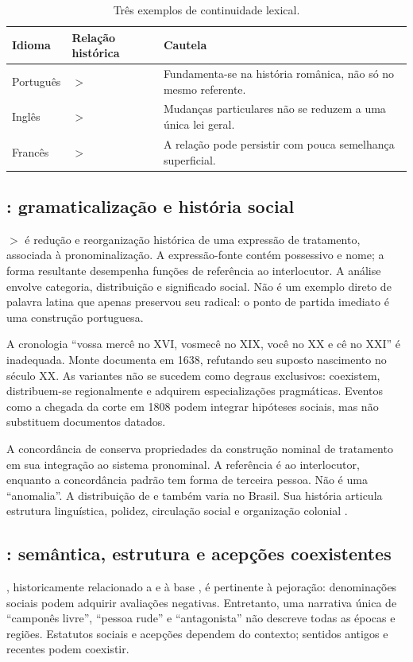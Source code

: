 \begin{table}[htbp]\centering\small
\caption{Três exemplos de continuidade lexical.}
\begin{tabularx}{\textwidth}{p{}p{}Y}\toprule
Idioma & Relação histórica & Cautela\\\midrule
Português &  $>$  & Fundamenta-se na história românica, não só no mesmo referente.\\
Inglês &  $>$  & Mudanças particulares não se reduzem a uma única lei geral.\\
Francês &  $>$  & A relação pode persistir com pouca semelhança superficial.\\\bottomrule
\end{tabularx}\end{table}

\subsection{: gramaticalização e história social}
 $>$  é redução e reorganização histórica de uma expressão de tratamento, associada à pronominalização. A expressão-fonte contém possessivo e nome; a forma resultante desempenha funções de referência ao interlocutor. A análise envolve categoria, distribuição e significado social. Não é um exemplo direto de palavra latina que apenas preservou seu radical: o ponto de partida imediato é uma construção portuguesa.

A cronologia ``vossa mercê no XVI, vosmecê no XIX, você no XX e cê no XXI'' é inadequada. Monte \cite{monte2019} documenta  em 1638, refutando seu suposto nascimento no século XX. As variantes não se sucedem como degraus exclusivos: coexistem, distribuem-se regionalmente e adquirem especializações pragmáticas. Eventos como a chegada da corte em 1808 podem integrar hipóteses sociais, mas não substituem documentos datados.

A concordância de  conserva propriedades da construção nominal de tratamento em sua integração ao sistema pronominal. A referência é ao interlocutor, enquanto a concordância padrão tem forma de terceira pessoa. Não é uma ``anomalia''. A distribuição de  e  também varia no Brasil. Sua história articula estrutura linguística, polidez, circulação social e organização colonial \cite{monte2019}.

\subsection{: semântica, estrutura e acepções coexistentes}
, historicamente relacionado a  e à base , é pertinente à pejoração: denominações sociais podem adquirir avaliações negativas. Entretanto, uma narrativa única de ``camponês livre'', ``pessoa rude'' e ``antagonista'' não descreve todas as épocas e regiões. Estatutos sociais e acepções dependem do contexto; sentidos antigos e recentes podem coexistir.

